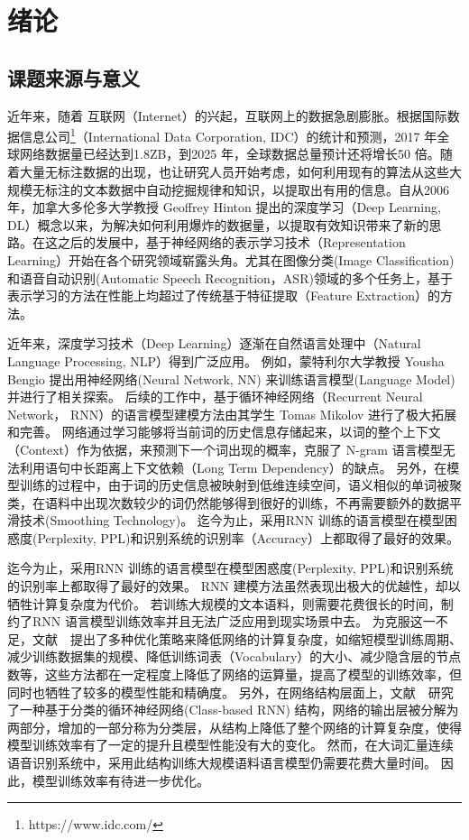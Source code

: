 \chapter{绪论}
\section{课题来源与意义}
近年来，随着 互联网（Internet）的兴起，互联网上的数据急剧膨胀。根据国际数据信息公司\footnote{https://www.idc.com/}（International Data Corporation, IDC）的统计和预测，2017 年全球网络数据量已经达到1.8ZB，到2025 年，全球数据总量预计还将增长50 倍。随着大量无标注数据的出现，也让研究人员开始考虑，如何利用现有的算法从这些大规模无标注的文本数据中自动挖掘规律和知识，以提取出有用的信息。自从2006年，加拿大多伦多大学教授 Geoffrey Hinton 提出的深度学习（Deep Learning, DL）概念以来，为解决如何利用爆炸的数据量，以提取有效知识带来了新的思路。在这之后的发展中，基于神经网络的表示学习技术（Representation Learning）开始在各个研究领域崭露头角。尤其在图像分类(Image Classification)和语音自动识别(Automatic Speech Recognition，ASR)领域的多个任务上，基于表示学习的方法在性能上均超过了传统基于特征提取（Feature Extraction）的方法。

近年来，深度学习技术（Deep Learning）逐渐在自然语言处理中（Natural Language Processing, NLP）得到广泛应用。 例如，蒙特利尔大学教授 Yousha Bengio 提出用神经网络(Neural Network, NN) 来训练语言模型(Language Model)并进行了相关探索。 后续的工作中，基于循环神经网络（Recurrent Neural Network， RNN）的语言模型建模方法由其学生 Tomas Mikolov 进行了极大拓展和完善。 网络通过学习能够将当前词的历史信息存储起来，以词的整个上下文（Context）作为依据，来预测下一个词出现的概率，克服了 N-gram 语言模型无法利用语句中长距离上下文依赖（Long Term Dependency）的缺点。 另外，在模型训练的过程中，由于词的历史信息被映射到低维连续空间，语义相似的单词被聚类，在语料中出现次数较少的词仍然能够得到很好的训练，不再需要额外的数据平滑技术(Smoothing Technology)。
迄今为止，采用RNN 训练的语言模型在模型困惑度(Perplexity, PPL)和识别系统的识别率（Accuracy）上都取得了最好的效果。

迄今为止，采用RNN 训练的语言模型在模型困惑度(Perplexity, PPL)和识别系统的识别率上都取得了最好的效果。 RNN 建模方法虽然表现出极大的优越性，却以牺牲计算复杂度为代价。 若训练大规模的文本语料，则需要花费很长的时间，制约了RNN 语言模型训练效率并且无法广泛应用到现实场景中去。 为克服这一不足，文献~\cite{DBLP:conf/icassp/MikolovKBCK11}~提出了多种优化策略来降低网络的计算复杂度，如缩短模型训练周期、减少训练数据集的规模、降低训练词表（Vocabulary）的大小、减少隐含层的节点数等，这些方法都在一定程度上降低了网络的运算量，提高了模型的训练效率，但同时也牺牲了较多的模型性能和精确度。 另外，在网络结构层面上，文献~\cite{DBLP:journals/coling/BrownPdLM92}~研究了一种基于分类的循环神经网络(Class-based RNN) 结构，网络的输出层被分解为两部分，增加的一部分称为分类层，从结构上降低了整个网络的计算复杂度，使得模型训练效率有了一定的提升且模型性能没有大的变化。 然而，在大词汇量连续语音识别系统中，采用此结构训练大规模语料语言模型仍需要花费大量时间。 因此，模型训练效率有待进一步优化。

